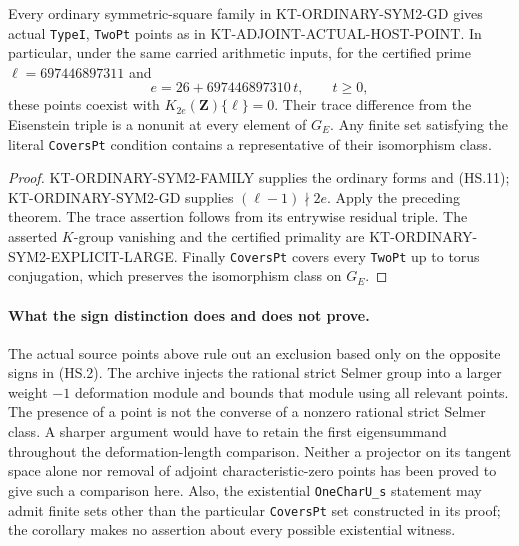 \begin{corollary}
Every ordinary symmetric-square family in
KT-ORDINARY-SYM2-GD gives actual \texttt{TypeI},
\texttt{TwoPt} points as in KT-ADJOINT-ACTUAL-HOST-POINT.
In particular, under the same carried arithmetic inputs,
for the certified prime $\ell=697446897311$ and
\[
                   e=26+697446897310\,t,\qquad t\geq0,
\]
these points coexist with $K_{2e}(\mathbf Z)\{\ell\}=0$.
Their trace difference from the Eisenstein triple is a
nonunit at every element of $G_E$.  Any finite set satisfying
the literal \texttt{CoversPt} condition contains a
representative of their isomorphism class.
\end{corollary}
\begin{proof}
KT-ORDINARY-SYM2-FAMILY supplies the ordinary forms and
(HS.11); KT-ORDINARY-SYM2-GD supplies
$(\ell-1)\nmid2e$.  Apply the preceding theorem.
The trace assertion follows from its entrywise residual
triple.  The asserted $K$-group vanishing and the certified
primality are KT-ORDINARY-SYM2-EXPLICIT-LARGE.
Finally \texttt{CoversPt} covers every \texttt{TwoPt}
up to torus conjugation, which preserves the isomorphism
class on $G_E$.
\end{proof}

\paragraph{What the sign distinction does and does not prove.}
The actual source points above rule out an exclusion based
only on the opposite signs in (HS.2).  The archive injects
the rational strict Selmer group into a larger weight
$-1$ deformation module and bounds that module using all
relevant points.  The presence of a point is not the
converse of a nonzero rational strict Selmer class.
A sharper argument would have to retain the first
eigensummand throughout the deformation-length comparison.
Neither a projector on its tangent space alone nor removal
of adjoint characteristic-zero points has been proved to
give such a comparison here.  Also, the existential
\texttt{OneCharU\_s} statement may admit finite sets other
than the particular \texttt{CoversPt} set constructed in
its proof; the corollary makes no assertion about every
possible existential witness.

